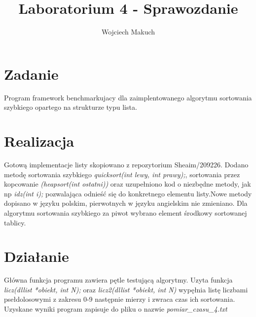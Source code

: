 \documentclass[11pt,a4paper]{article}
\title{Laboratorium 4 - Sprawozdanie}
\author{Wojciech Makuch}
\begin{document}
\maketitle
\section{Zadanie}
Program framework benchmarkujacy dla zaimplentowanego algorytmu sortowania szybkiego opartego na strukturze typu lista.
\section{Realizacja}
Gotową implementacje listy skopiowano z repozytorium Sheaim/209226. Dodano metodę sortowania szybkiego \textsl{quicksort(int lewy, int prawy);}, sortowania przez kopcowanie \textsl{(heapsort(int ostatni))} oraz uzupełniono kod o niezbędne metody, jak np \textsl{idz(int i);} pozwalająca odnieść się do konkretnego elementu listy.Nowe metody dopisano w języku polskim, pierwotnych w języku angielskim nie zmieniano. Dla algorytmu sortowania szybkiego za piwot wybrano element środkowy sortowanej tablicy. 

\section{Działanie}
Główna funkcja programu zawiera pętle testującą algorytmy. Uzyta funkcja \textsl{licz(dllist *obiekt, int N);} oraz \textsl{licz2(dllist *obiekt, int N)} wypęłnia listę liczbami psełdolosowymi z zakresu 0-9 następnie mierzy i zwraca czas ich sortowania. Uzyskane wyniki program zapisuje do pliku o nazwie \textsl{pomiar\_czasu\_4.txt}
\end{document}
